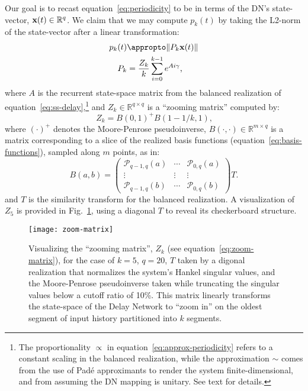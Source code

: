 Our goal is to recast equation~\ref{eq:periodicity} to be in terms of the DN's state-vector, $\mathbf{x}(t) \in \mathbb{R}^q$.
We claim that we may compute $p_k(t)$ by taking the L2-norm of the state-vector after a linear transformation:
\begin{align} \label{eq:approx-periodicity}
p_k(t) &\appropto \| P_k \V{x}(t) \| \\
P_k &= \frac{Z_k}{k} \sum_{i=0}^{k-1} e^{A i \gamma} \text{,} \label{eq:periodicity-matrix}
\end{align}
where $A$ is the recurrent state-space matrix from the balanced realization of equation~\ref{eq:ss-delay},\footnote{
The proportionality $\propto$ in equation~\ref{eq:approx-periodicity} refers to a constant scaling in the balanced realization, while the approximation $\sim$ comes from the use of Pad\'e approximants to render the system finite-dimensional, and from assuming the DN mapping is unitary.
See text for details.
}
and $Z_k \in \mathbb{R}^{q \times q}$ is a ``zooming matrix'' computed by:
\begin{equation} \label{eq:zoom-matrix}
Z_k = B(0, 1)^+ B(1-1/k, 1) \text{,} %
\end{equation}
where $(\cdot)^+$ denotes the Moore-Penrose pseudoinverse, $B(\cdot, \cdot) \in \mathbb{R}^{m \times q}$ is a matrix corresponding to a slice of the realized basis functions (equation~\ref{eq:basis-functions}), sampled along $m$ points, as in:
\begin{equation}
B(a, b) = \begin{pmatrix}
\mathcal{P}_{q-1,q}(a) & \cdots & \mathcal{P}_{0,q}(a) \\
\vdots & \vdots & \vdots \\
\mathcal{P}_{q-1,q}(b) & \cdots & \mathcal{P}_{0,q}(b)
\end{pmatrix} T \text{.}
\end{equation}
and $T$ is the similarity transform for the balanced realization.
A visualization of $Z_5$ is provided in Fig.~\ref{fig:zoom-matrix}, using a diagonal $T$ to reveal its checkerboard structure.

\begin{figure}
  \centering
  \texttt{[image: zoom-matrix]}
  \caption{\label{fig:zoom-matrix}
    Visualizing the ``zooming matrix'', $Z_k$ (see equation~\ref{eq:zoom-matrix}), for the case of $k=5$, $q=20$, $T$ taken by a digonal realization that normalizes the system's Hankel singular values, and the Moore-Penrose pseudoinverse taken while truncating the singular values below a cutoff ratio of 10\%.
   This matrix linearly transforms the state-space of the Delay Network to ``zoom in'' on the oldest segment of input history partitioned into $k$ segments.
  }
\end{figure}

